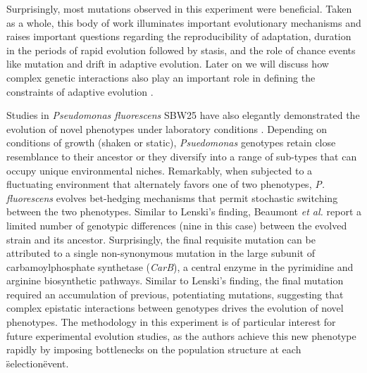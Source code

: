 Surprisingly, most mutations observed in this experiment were beneficial. Taken as a whole, this body of work illuminates important evolutionary mechanisms and raises important questions regarding the reproducibility of adaptation, duration in the periods of rapid evolution followed by stasis, and the role of chance events like mutation and drift in adaptive evolution. Later on we will discuss how complex genetic interactions also play an important role in defining the constraints of adaptive evolution \cite{lenski_dynamics_1994}.  

Studies in \textit{Pseudomonas fluorescens} SBW25 have also elegantly demonstrated the evolution of novel phenotypes under laboratory conditions \cite{beaumont_experimental_2009}. Depending on conditions of growth (shaken or static), \textit{Psuedomonas} genotypes retain close resemblance to their ancestor or they diversify into a range of sub-types that can occupy unique environmental niches.  Remarkably, when subjected to a fluctuating environment that alternately favors one of two phenotypes, \textit{P. fluorescens} evolves bet-hedging mechanisms that permit stochastic switching between the two phenotypes.  Similar to Lenski's finding, Beaumont \textit{et al.} report a limited number of genotypic differences (nine in this case) between the evolved strain and its ancestor. Surprisingly, the final requisite mutation can be attributed to a single non-synonymous mutation in the large subunit of carbamoylphosphate synthetase (\textit{CarB}), a central enzyme in the pyrimidine and arginine biosynthetic pathways. Similar to Lenski’s finding, the final mutation required an accumulation of previous, potentiating mutations, suggesting that complex epistatic interactions between genotypes drives the evolution of novel phenotypes.  The methodology in this experiment is of particular interest for future experimental evolution studies, as the authors achieve this new phenotype rapidly by imposing bottlenecks on the population structure at each \"selection\" event. 

